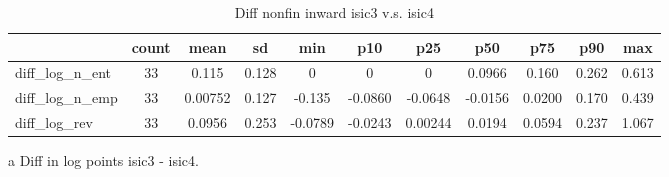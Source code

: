 \begin{table}[h]\scriptsize\caption{Diff nonfin inward isic3 v.s. isic4}\centering
\begin{threeparttable}\begin{tabular}{l*{10}c}\toprule
            &       count&        mean&          sd&         min&         p10&         p25&         p50&         p75&         p90&         max\\
\midrule
diff\_log\_n\_ent&          33&       0.115&       0.128&           0&           0&           0&      0.0966&       0.160&       0.262&       0.613\\
diff\_log\_n\_emp&          33&     0.00752&       0.127&      -0.135&     -0.0860&     -0.0648&     -0.0156&      0.0200&       0.170&       0.439\\
diff\_log\_rev&          33&      0.0956&       0.253&     -0.0789&     -0.0243&     0.00244&      0.0194&      0.0594&       0.237&       1.067\\
\bottomrule\end{tabular}\begin{tablenotes}
\item[a] Diff in log points isic3 - isic4.
\end{tablenotes}\end{threeparttable}\end{table}
